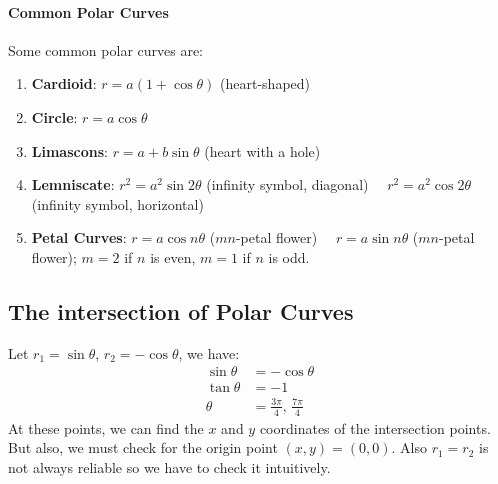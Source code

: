 \documentclass[11pt]{article}
\begin{document}
\paragraph{Common Polar Curves} Some common polar curves are:
\begin{enumerate}
    \item \textbf{Cardioid}: $r = a(1 + \cos \theta)$ (heart-shaped)
    \item \textbf{Circle}: $r = a\cos \theta$ 
    \item \textbf{Limascons}: $r = a + b\sin \theta$ (heart with a hole)
    \item \textbf{Lemniscate}: $r^2 = a^2\sin 2\theta$ (infinity symbol, diagonal) \vspace{1em} $\quad r^2 = a^2\cos 2\theta$ (infinity symbol, horizontal)
    \item \textbf{Petal Curves}: $r = a\cos n\theta$ ($mn$-petal flower) \vspace{1em} $\quad r = a\sin n\theta$ ($mn$-petal flower); $m=2$ if $n$ is even, $m=1$ if $n$ is odd.
\end{enumerate}
\subsection{The intersection of Polar Curves}
\begin{example}
    Let $r_1 = \sin \theta$, $r_2 = -\cos \theta$, we have:
    \begin{align*}
        \sin \theta &= -\cos \theta \\
        \tan \theta &= -1 \\
        \theta &= \frac{3\pi}{4},\, \frac{7\pi}{4}
    \end{align*}
    At these points, we can find the $x$ and $y$ coordinates of the intersection points. But also, we must check for the origin point $(x,y) = (0,0)$. Also $r_1 = r_2$ is not always reliable so we have to check it intuitively.
\end{example}
\appendix

\end{document}
